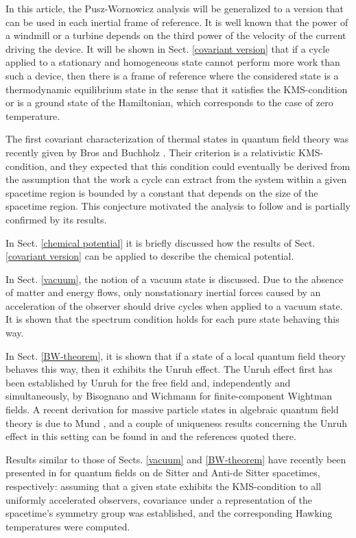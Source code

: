 \documentclass[a4paper,11pt]{article}
\def\go{\omega}
\begin{document}
In this article, the Pusz-Wornowicz analysis
will be generalized to a version that can be used in each
inertial frame of reference. It is well known that
the power of a windmill or a turbine depends on the third power of the
velocity of the current driving the device. It will be shown
in Sect. \ref{covariant version} that if a cycle applied
to a stationary and homogeneous state \myHighlight{$\go$}\coordHE{} cannot perform more
work than such a device, then
there is a frame of reference where the considered state is a thermodynamic
equilibrium state in the sense that it satisfies the KMS-condition or is a
ground state of the Hamiltonian,
which corresponds to the case of zero temperature.

The first covariant characterization of
thermal states in quantum field theory was recently given by Bros and
Buchholz \cite{BB94}.
Their criterion is a relativistic KMS-condition, and they expected that this
condition could eventually be derived from the assumption that the
work a cycle can extract from the system within a given spacetime
region is bounded by a constant that depends on the size of the
spacetime region. This conjecture motivated the analysis to follow
and is partially confirmed by its results.

In Sect. \ref{chemical potential} it is briefly discussed
how the results of Sect. \ref{covariant version} can be applied
to describe the chemical potential.

In Sect. \ref{vacuum}, the notion of a vacuum state is discussed.
Due to the
absence of matter and energy flows, only nonstationary inertial forces
caused by an acceleration of the observer should drive cycles when
applied to a vacuum state. It is shown that the spectrum condition
holds for each pure state behaving this way.

In Sect. \ref{BW-theorem}, it is shown that
if a state of a local quantum field theory behaves this way, then
it exhibits the Unruh effect. The Unruh effect first has been
established by Unruh \cite{Unr76} for the free field and,
independently and simultaneously,
by Bisognano and Wichmann \cite{BW75,BW76} for finite-component
Wightman fields. A recent derivation for
massive particle states in algebraic quantum field theory is due to
Mund \cite{Mun01}, and a couple of uniqueness results concerning
the Unruh effect in this setting can be found in \cite{Bor00,Kuc00}
and the references quoted there.

Results similar to those of Sects. \ref{vacuum} and \ref{BW-theorem}
have recently been presented in \cite{BB99,BFS99} for quantum
fields on de Sitter and Anti-de Sitter spacetimes,
respectively: assuming that a given state exhibits
the KMS-condition to all uniformly accelerated observers,
covariance under a representation
of the spacetime's symmetry group was established, and the
corresponding Hawking temperatures were computed.
\end{document}
